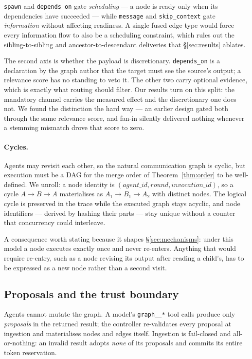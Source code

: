 \documentclass[10pt]{article}
\begin{document}
\texttt{spawn} and \texttt{depends\_on} gate \emph{scheduling} --- a node is
ready only when its dependencies have succeeded --- while \texttt{message} and
\texttt{skip\_context} gate \emph{information} without affecting readiness. A
single fused edge type would force every information flow to also be a
scheduling constraint, which rules out the sibling-to-sibling and
ancestor-to-descendant deliveries that §\ref{sec:results} ablates.

The second axis is whether the payload is discretionary. \texttt{depends\_on}
is a declaration by the graph author that the target must see the source's
output; a relevance score has no standing to veto it. The other two carry
optional evidence, which is exactly what routing should filter. Our results turn
on this split: the mandatory channel carries the measured effect and the
discretionary one does not. We found the distinction the hard way --- an earlier
design gated both through the same relevance score, and fan-in silently
delivered nothing whenever a stemming mismatch drove that score to zero.

\paragraph{Cycles.}
Agents may revisit each other, so the natural communication graph is cyclic,
but execution must be a DAG for the merge order of Theorem~\ref{thm:order} to be
well-defined. We unroll: a node identity is
$(\mathit{agent\_id}, \mathit{round}, \mathit{invocation\_id})$, so a cycle
$A \to B \to A$ materialises as $A_1 \to B_1 \to A_2$ with distinct nodes. The
logical cycle is preserved in the trace while the executed graph stays acyclic,
and node identifiers --- derived by hashing their parts --- stay unique without a
counter that concurrency could interleave.

A consequence worth stating because it shapes §\ref{sec:mechanisms}: under this
model a node executes exactly once and never re-enters. Anything that would
require re-entry, such as a node revising its output after reading a child's,
has to be expressed as a new node rather than a second visit.

\subsection{Proposals and the trust boundary}

Agents cannot mutate the graph. A model's \texttt{graph\_\_*} tool calls produce
only \emph{proposals} in the returned result; the controller re-validates every
proposal at ingestion and materialises nodes and edges itself. Ingestion is
fail-closed and all-or-nothing: an invalid result adopts \emph{none} of its
proposals and commits its entire token reservation.
\end{document}
